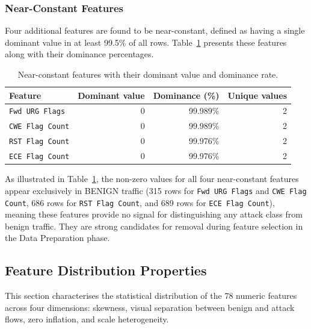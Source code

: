 \documentclass[12pt,a4paper]{article}
\begin{document}
\subsubsection{Near-Constant Features}

Four additional features are found to be near-constant, defined as having a single
dominant value in at least 99.5\% of all rows. Table~\ref{tab:nearconstant} presents
these features along with their dominance percentages.

\begin{table}[H]
    \centering
    \caption{Near-constant features with their dominant value and dominance rate.}
    \label{tab:nearconstant}
    \begin{tabular}{|l|r|r|r|}
        \hline
        \textbf{Feature}        & \textbf{Dominant value} & \textbf{Dominance (\%)} & \textbf{Unique values} \\
        \hline
        \texttt{Fwd URG Flags}  & 0                       & 99.989\%                & 2                      \\
        \hline
        \texttt{CWE Flag Count} & 0                       & 99.989\%                & 2                      \\
        \hline
        \texttt{RST Flag Count} & 0                       & 99.976\%                & 2                      \\
        \hline
        \texttt{ECE Flag Count} & 0                       & 99.976\%                & 2                      \\
        \hline
    \end{tabular}
\end{table}

As illustrated in Table~\ref{tab:nearconstant}, the non-zero values for all four
near-constant features appear exclusively in BENIGN traffic (315 rows for
\texttt{Fwd URG Flags} and \texttt{CWE Flag Count}, 686 rows for \texttt{RST Flag Count},
and 689 rows for \texttt{ECE Flag Count}), meaning these features provide no signal
for distinguishing any attack class from benign traffic. They are strong candidates for
removal during feature selection in the Data Preparation phase.

\subsection{Feature Distribution Properties}

This section characterises the statistical distribution of the 78 numeric features across
four dimensions: skewness, visual separation between benign and attack flows, zero
inflation, and scale heterogeneity.
\end{document}
